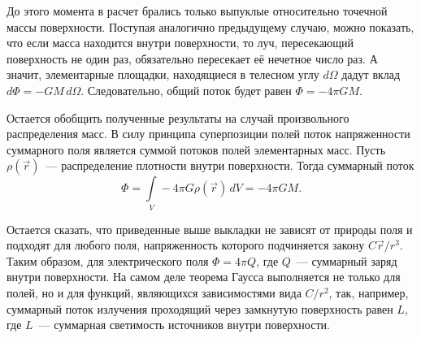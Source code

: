До этого момента в расчет брались только выпуклые относительно точечной массы поверхности. Поступая аналогично предыдущему случаю, можно показать, что если масса находится внутри поверхности, то луч, пересекающий поверхность не один раз, обязательно пересекает её нечетное число раз. А значит, элементарные площадки, находящиеся в телесном углу $d\Omega$ дадут вклад $d\Phi = - GM \,d \Omega$. Следовательно, общий поток будет равен $\Phi = - 4 \pi GM$.

Остается обобщить полученные результаты на случай произвольного распределения масс. В силу принципа суперпозиции полей поток напряженности суммарного поля является суммой потоков полей элементарных масс. Пусть $\rho(\vec r)$~--- распределение плотности внутри поверхности. Тогда суммарный поток
\begin{equation*}
	\Phi = \int\limits_V -4\pi G \rho(\vec r) \,d V = -4 \pi GM.
\end{equation*}

Остается сказать, что приведенные выше выкладки не зависят от природы поля и подходят для любого поля, напряженность которого подчиняется закону $C\vec{r}/r^3$. Таким образом, для электрического поля $\Phi = 4\pi Q$, где $Q$~--- суммарный заряд внутри поверхности. На самом деле теорема Гаусса выполняется не только для полей, но и для функций, являющихся зависимостями вида $C/r^2$, так, например, суммарный поток излучения проходящий через замкнутую поверхность равен $L$, где $L$~--- суммарная светимость источников внутри поверхности.

